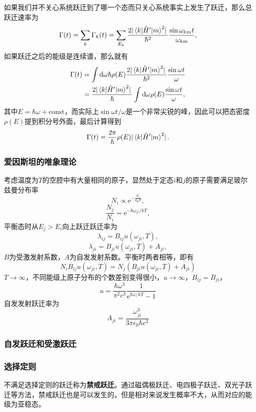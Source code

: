 \documentclass[UTF8, a4paper]{ctexart}
\newcommand*{\ee}{\mathrm{e}}
\renewcommand*{\dd}{\mathop{}\!\mathrm{d}}
\newcommand*{\const}{\mathrm{const}}
\begin{document}
如果我们并不关心系统跃迁到了哪一个态而只关心系统事实上发生了跃迁，那么总跃迁速率为
\[
    \Gamma(t) = \sum_k \Gamma_k(t) = \sum_{E_k} \frac{2 \abs*{\mel{k}{\hat{H}'}{m}^2}}{\hbar^2} \frac{\sin \omega_{km} t}{\omega_{km}},
\]
如果跃迁之后的能级是连续谱，那么就有
\[
    \begin{aligned}
        \Gamma(t) &= \int \dd{\omega} \hbar \rho(E) \frac{2 \abs*{\mel{k}{\hat{H}'}{m}^2}}{\hbar^2} \frac{\sin \omega t}{\omega} \\
        &= \frac{2 \abs*{\mel{k}{\hat{H}'}{m}^2}}{\hbar} \int \dd{\omega} \rho(E) \frac{\sin \omega t}{\omega}, 
    \end{aligned}
\]
其中$E = \hbar \omega + \const$，而实际上$\sin \omega t / \omega$是一个非常尖锐的峰，因此可以把态密度$\rho(E)$提到积分号外面，最后计算得到
\begin{equation}
    \Gamma(t) = \frac{2\pi}{\hbar} \rho(E) \abs*{\mel{k}{\hat{H}'}{m}^2}.
\end{equation}

\subsubsection{爱因斯坦的唯象理论}

考虑温度为$T$的空腔中有大量相同的原子，显然处于定态$i$和$j$的原子需要满足玻尔兹曼分布率
\[
    N_i \propto \ee^{-\frac{E_i}{k_\text{B} T}},
\]
\[
    \frac{N_j}{N_i} = \ee^{-\hbar \omega_{ji} / kT},
\]
平衡态时从$E_j > E_i$向上跃迁跃迁率为
\[
    \lambda_{ij} = B_{ij} u(\omega_{ji}, T),
\]
\[
    \lambda_{ji} = B_{ji} u(\omega_{ji}, T) + A_{ji},
\]
$B$为受激发射系数，$A$为自发发射系数。平衡时两者相等，即有
\[
    N_i B_{ij} u(\omega_{ji}, T) = N_j (B_{ji} u(\omega_{ji}, T) + A_{ji})
\]
$T \to \infty$，不同能级上原子分布的个数差别变得很小，$u \to \infty$，$B_{ij} = B_{ji}$，
\[
    u = \frac{\hbar \omega^3}{\pi^2 c^3} \frac{1}{\ee^{\hbar \omega / kT} - 1}
\]
自发发射跃迁率为
\[
    A_{ji} = \frac{\omega_{ji}^3}{3\pi \epsilon_0 \hbar c^3}
\]

\subsubsection{自发跃迁和受激跃迁}

\subsubsection{选择定则}

不满足选择定则的跃迁称为\textbf{禁戒跃迁}。通过磁偶极跃迁、电四极子跃迁、双光子跃迁等方法，禁戒跃迁也是可以发生的，但是相对来说发生概率不大，从而对应的能级为亚稳态。
\end{document}
